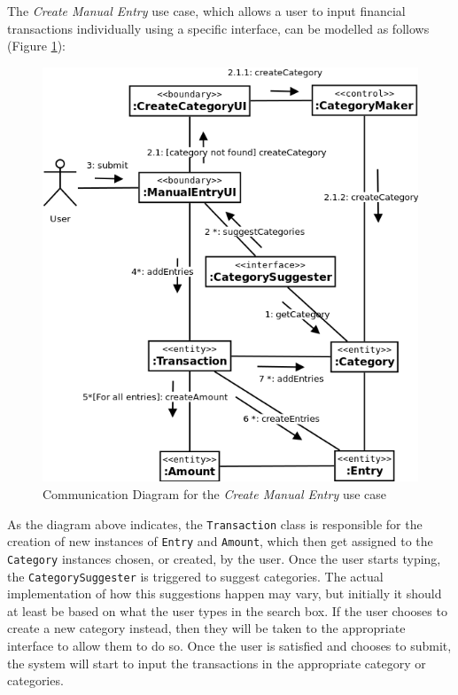 The \emph{Create Manual Entry} use case, which allows a
user to input financial transactions individually using a specific interface,
can be modelled as follows (Figure \ref{fig:CommDiagram.CreateManualEntry}):
\begin{figure}[ht!]
  \begin{center}
    \includegraphics[width=12cm]{./contents/img/Comm_Diagram_-_Manual_Entry.png}
  \end{center}
  \caption{Communication Diagram for the \emph{Create Manual Entry} use case}
  \label{fig:CommDiagram.CreateManualEntry}
\end{figure}
\FloatBarrier

As the diagram above indicates, the \texttt{Transaction} class is responsible for
the creation of new instances of \texttt{Entry} and \texttt{Amount}, which then get
assigned to the \texttt{Category} instances chosen, or created, by the user.
Once the user starts typing, the \texttt{CategorySuggester} is triggered to
suggest categories. The actual implementation of how this suggestions happen
may vary, but initially it should at least be based on what the user types in
the search box. If the user chooses to create a new category instead, then they
will be taken to the appropriate interface to allow them to do so. Once the
user is satisfied and chooses to submit, the system will start to input the
transactions in the appropriate category or categories.

